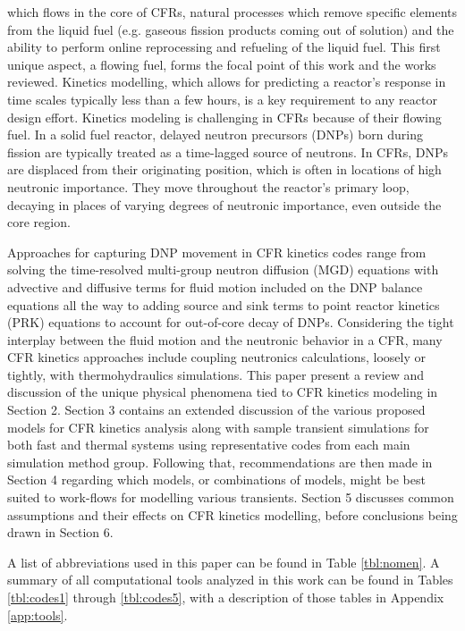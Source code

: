 \documentclass[review]{elsarticle}
\begin{document}
 which flows in the core of CFRs, natural processes which remove specific elements from
 the liquid fuel (e.g. gaseous fission products coming out of solution)
and the ability to perform online reprocessing and refueling of the liquid fuel.
 This first unique aspect, a flowing fuel, forms the focal point of this work and the
 works reviewed. Kinetics modelling, which allows for predicting
a reactor's response in time scales typically less than a few hours, is a key
requirement to any reactor design effort. Kinetics modeling is challenging in CFRs
because of their flowing fuel. In a solid fuel reactor, delayed neutron precursors (DNPs) 
born during fission are typically treated as a time-lagged source of neutrons.
In CFRs, DNPs are displaced from their originating position, which is 
often in locations 
of high neutronic importance. They move throughout the reactor's primary loop,
decaying in places of varying degrees of
neutronic importance, even outside the core region.
\par Approaches for capturing DNP movement in CFR kinetics codes 
range from solving the 
time-resolved multi-group neutron diffusion (MGD) equations with advective and
diffusive terms for fluid motion included on the DNP balance equations
all the way to adding
source and sink terms to point reactor kinetics (PRK) equations to account
for out-of-core decay of DNPs. Considering the tight interplay between the
fluid motion and the neutronic behavior in a CFR, many CFR kinetics approaches
include coupling neutronics calculations, loosely or tightly, 
with thermohydraulics simulations. This paper present a review and discussion of the
unique physical phenomena tied to CFR kinetics modeling in Section 2. Section 3 contains
an extended discussion of the various proposed models for CFR
kinetics analysis along with sample transient simulations for
both fast and thermal systems using representative codes from each main
simulation method group. Following that, recommendations are then made in Section 4 regarding
which models, or combinations of models, might be best suited to 
work-flows for modelling various transients.
 Section 5 discusses common assumptions and their effects on CFR
kinetics modelling, before conclusions being drawn in Section 6.
\par A list of abbreviations used in this paper can be found in Table
\ref{tbl:nomen}. A summary of all computational tools analyzed
in this work can be found in Tables \ref{tbl:codes1} through \ref{tbl:codes5},
 with a description of those tables in Appendix \ref{app:tools}.
\end{document}
